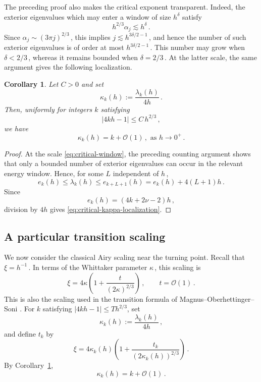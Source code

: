 \documentclass[11pt]{amsart}
\numberwithin{equation}{section}
\newtheorem{corollary}[theorem]{Corollary}
\theoremstyle{remark}
\newcommand{\mn}{\medskip\noindent}
\begin{document}
\mn
The preceding proof also makes the critical exponent transparent.
Indeed, the exterior eigenvalues which may enter a window of size
$h^\delta$ satisfy
\[
	h^{2/3}\alpha_j\lesssim h^\delta\,.
\]
%
Since $\alpha_j\sim(3\pi j)^{2/3}\,$, this implies
$j\lesssim h^{3\delta/2-1}\,$, and hence the number of such exterior
eigenvalues is of order at most $h^{3\delta/2-1}\,$. This number may grow when $\delta<2/3\,$, whereas
	it remains bounded when $\delta=2/3\,$. At the latter scale, the same
	argument gives the following localization.
	
	

	
	\begin{corollary}\label{cor:kappa-k-critical}
		Let $C>0$ and set
		\begin{equation}\label{eq:kappa-k-definition}
			\kappa_k(h):=\frac{\lambda_k(h)}{4h}\,.
		\end{equation}
		Then, uniformly for integers $k$ satisfying
		\begin{equation}\label{eq:critical-window}
			|4kh-1|\leq C\,h^{2/3}\,,
		\end{equation}
		we have
		\begin{equation}\label{eq:critical-kappa-localization}
			\kappa_k(h)=k+\mathcal O(1)\,,
			\mbox{ as } h\to 0^+\,.
		\end{equation}
	\end{corollary}
	\begin{proof}
		At the scale \eqref{eq:critical-window}, the preceding counting
		argument shows that only a bounded number of exterior eigenvalues
		can occur in the relevant energy window. Hence, for some $L$
		independent of $h\,$,
		\[
		e_k(h)\leq\lambda_k(h)
			\leq e_{k+L+1}(h)
			=e_k(h)+4(L+1)h\,.
		\]
		Since
		\[	e_k(h)=(4k+2\nu-2)h\,,\]
		division by $4h$ gives
		\eqref{eq:critical-kappa-localization}.
	\end{proof}








\subsection{A particular transition scaling}

We now consider the classical Airy scaling near the turning point.
Recall that $\xi=h^{-1}\,$. In terms of the Whittaker parameter $\kappa\,$,
this scaling is
%
\[	\xi
	=
	4\kappa
	\left(
	1+\frac{t}{(2\kappa)^{2/3}}
	\right)\,,
	\qquad
	t=\mathcal O(1)\,.
\]
%
This is also the scaling used in the transition formula of
Magnus--Oberhettinger--Soni
\cite[p.~292, Case~3]{MOS1966}.  For $k$ satisfying
	$|4kh-1|\leq Th^{2/3}$, set
\[
\kappa_k(h):=\frac{\lambda_k(h)}{4h}\,,
\]
and define $t_k$ by
\begin{equation}\label{eq:def-tk}
	\xi
	=
	4\kappa_k(h)
	\left(
	1+\frac{t_k}{(2\kappa_k(h))^{2/3}}
	\right)\,.
\end{equation}
By Corollary~\ref{cor:kappa-k-critical},
\[
	\kappa_k(h)=k+\mathcal O(1)\,.
\]
%
% 
%
\end{document}
